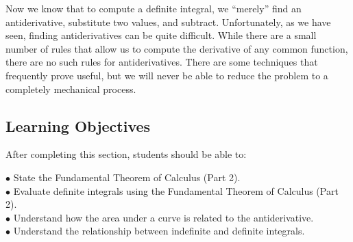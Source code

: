 \documentclass{ximera}
\begin{document}
Now we know that to compute a definite integral,  we ``merely'' find an antiderivative, substitute two values, and subtract. Unfortunately, as we have seen,
finding antiderivatives can be quite difficult. While there are a
small number of rules that allow us to compute the derivative of any
common function, there are no such rules for antiderivatives. There
are some techniques that frequently prove useful, but we will never be
able to reduce the problem to a completely mechanical process.



\subsection{Learning Objectives}
After completing this section, students should be able to:
\vspace{.05in}

\noindent$\bullet$ State the Fundamental Theorem of Calculus (Part 2).
\\$\bullet$ Evaluate definite integrals using the Fundamental Theorem of Calculus (Part 2).
\\$\bullet$ Understand how the area under a curve is related to the antiderivative.
\\$\bullet$ Understand the relationship between indefinite and definite integrals.
\end{document}
